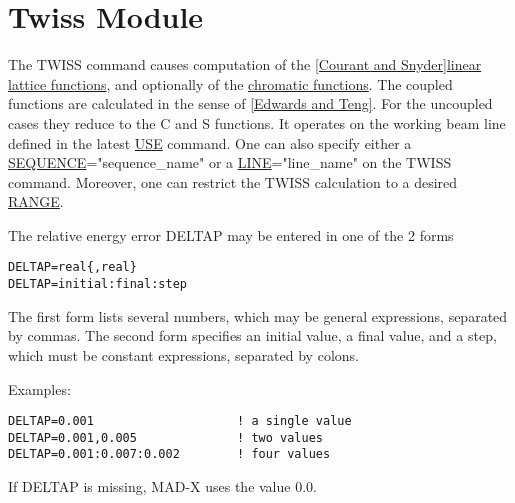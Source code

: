 
\chapter{Twiss Module}

The TWISS command causes computation of the \href{../Introduction/bibliography.html#courant}{[Courant and Snyder]}\href{../Introduction/tables.html#linear}{linear lattice functions}, and optionally of the \href{../Introduction/tables.html#chrom}{chromatic functions}. The coupled functions are calculated in the sense of \href{../Introduction/bibliography.html#edwards}{[Edwards and Teng]}. For the uncoupled cases they reduce to the C and S functions. It operates on the working beam line defined in the latest \href{../control/general.html#use}{USE} command. One can also specify either a \href{../Introduction/sequence.html}{SEQUENCE}="sequence\_name" or a \href{../Introduction/line.html}{LINE}="line\_name" on the TWISS command. Moreover, one can restrict the TWISS calculation to a desired \href{../Introduction/ranges.html#range}{RANGE}. 

The relative energy error DELTAP may be entered in one of the 2 forms 
\begin{verbatim}
DELTAP=real{,real}
DELTAP=initial:final:step
\end{verbatim} 

The first form lists several numbers, which may be general expressions, separated by commas. The second form specifies an initial value, a final value, and a step, which must be constant expressions, separated by colons. 

Examples: 
\begin{verbatim}
DELTAP=0.001                    ! a single value
DELTAP=0.001,0.005              ! two values
DELTAP=0.001:0.007:0.002        ! four values
\end{verbatim}

If DELTAP is missing, MAD-X uses the value 0.0. 


